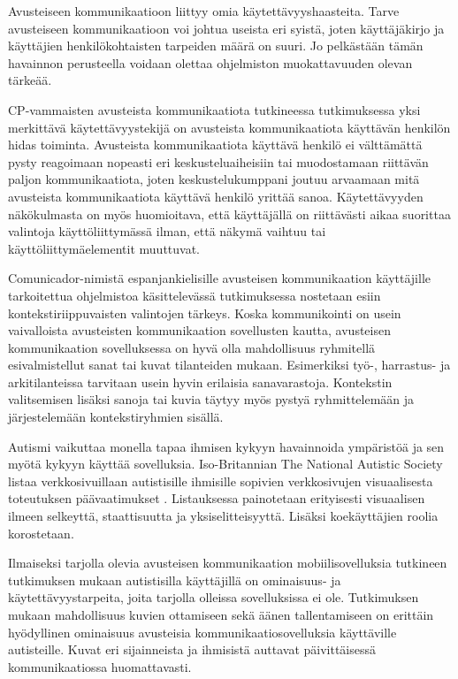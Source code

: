 \documentclass[utf8]{gradu3}
\begin{document}
Avusteiseen kommunikaatioon liittyy omia käytettävyyshaasteita. Tarve avusteiseen kommunikaatioon voi johtua useista eri syistä, joten käyttäjäkirjo ja käyttäjien henkilökohtaisten tarpeiden määrä on suuri. Jo pelkästään tämän havainnon perusteella voidaan olettaa ohjelmiston muokattavuuden olevan tärkeää.

CP-vammaisten avusteista kommunikaatiota tutkineessa tutkimuksessa \parencite[]{classmate-aac-study} yksi merkittävä käytettävyystekijä on avusteista kommunikaatiota käyttävän henkilön hidas toiminta. Avusteista kommunikaatiota käyttävä henkilö ei välttämättä pysty reagoimaan nopeasti eri keskusteluaiheisiin tai muodostamaan riittävän paljon kommunikaatiota, joten keskustelukumppani joutuu arvaamaan mitä avusteista kommunikaatiota käyttävä henkilö yrittää sanoa. Käytettävyyden näkökulmasta on myös huomioitava, että käyttäjällä on riittävästi aikaa suorittaa valintoja käyttöliittymässä ilman, että näkymä vaihtuu tai käyttöliittymäelementit muuttuvat.

Comunicador-nimistä espanjankielisille avusteisen kommunikaation käyttäjille tarkoitettua ohjelmistoa käsittelevässä tutkimuksessa \parencite[]{graphic-communicator} nostetaan esiin kontekstiriippuvaisten valintojen tärkeys. Koska kommunikointi on usein vaivalloista avusteisten kommunikaation sovellusten kautta, avusteisen kommunikaation sovelluksessa on hyvä olla mahdollisuus ryhmitellä esivalmistellut sanat tai kuvat tilanteiden mukaan. Esimerkiksi työ-, harrastus- ja arkitilanteissa tarvitaan usein hyvin erilaisia sanavarastoja. Kontekstin valitsemisen lisäksi sanoja tai kuvia täytyy myös pystyä ryhmittelemään ja järjestelemään kontekstiryhmien sisällä.

Autismi vaikuttaa monella tapaa ihmisen kykyyn havainnoida ympäristöä ja sen myötä kykyyn käyttää sovelluksia. Iso-Britannian The National Autistic Society listaa verkkosivuillaan autistisille ihmisille sopivien verkkosivujen visuaalisesta toteutuksen päävaatimukset \parencite[]{autism-friendly-websites}. Listauksessa painotetaan erityisesti visuaalisen ilmeen selkeyttä, staattisuutta ja yksiselitteisyyttä. Lisäksi koekäyttäjien roolia korostetaan.

Ilmaiseksi tarjolla olevia avusteisen kommunikaation mobiilisovelluksia tutkineen tutkimuksen \parencite[]{autism-mobile-usability} mukaan autistisilla käyttäjillä on ominaisuus- ja käytettävyystarpeita, joita tarjolla olleissa sovelluksissa ei ole. Tutkimuksen mukaan mahdollisuus kuvien ottamiseen sekä äänen tallentamiseen on erittäin hyödyllinen ominaisuus avusteisia kommunikaatiosovelluksia käyttäville autisteille. Kuvat eri sijainneista ja ihmisistä auttavat päivittäisessä kommunikaatiossa huomattavasti. 
\end{document}
